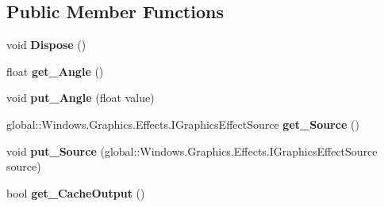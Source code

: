 \subsection*{Public Member Functions}
\begin{DoxyCompactItemize}
\item 
\mbox{\label{class_microsoft_1_1_graphics_1_1_canvas_1_1_effects_1_1_hue_rotation_effect_a810d0ccc36d934585b46ee347f904a5a}} 
void {\bfseries Dispose} ()
\item 
\mbox{\label{class_microsoft_1_1_graphics_1_1_canvas_1_1_effects_1_1_hue_rotation_effect_a3a3718dbc379b4681eef27cfbf8da3b1}} 
float {\bfseries get\+\_\+\+Angle} ()
\item 
\mbox{\label{class_microsoft_1_1_graphics_1_1_canvas_1_1_effects_1_1_hue_rotation_effect_ae9759f57343903aac17e06caa7782f14}} 
void {\bfseries put\+\_\+\+Angle} (float value)
\item 
\mbox{\label{class_microsoft_1_1_graphics_1_1_canvas_1_1_effects_1_1_hue_rotation_effect_a17269efe1df5109e5fb12abe58b92834}} 
global\+::\+Windows.\+Graphics.\+Effects.\+I\+Graphics\+Effect\+Source {\bfseries get\+\_\+\+Source} ()
\item 
\mbox{\label{class_microsoft_1_1_graphics_1_1_canvas_1_1_effects_1_1_hue_rotation_effect_aa5c933e9d4e46941d0bc0dfbadd47e44}} 
void {\bfseries put\+\_\+\+Source} (global\+::\+Windows.\+Graphics.\+Effects.\+I\+Graphics\+Effect\+Source source)
\item 
\mbox{\label{class_microsoft_1_1_graphics_1_1_canvas_1_1_effects_1_1_hue_rotation_effect_a212f0bc97efd7322e740a5daef23bfc8}} 
bool {\bfseries get\+\_\+\+Cache\+Output} ()
\item 
\mbox{\label{class_microsoft_1_1_graphics_1_1_canvas_1_1_effects_1_1_hue_rotation_effect_a611b8e8d5501b86bc3ed437b0f5dac98}} 

\end{DoxyCompactItemize}
